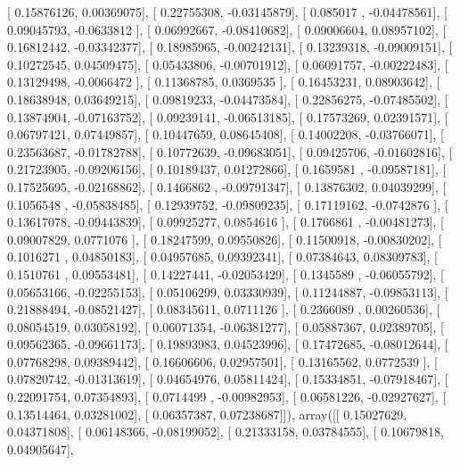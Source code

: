 \documentclass{article}
\begin{document}
       [ 0.15876126,  0.00369075],
       [ 0.22755308, -0.03145879],
       [ 0.085017  , -0.04478561],
       [ 0.09045793, -0.0633812 ],
       [ 0.06992667, -0.08410682],
       [ 0.09006604,  0.08957102],
       [ 0.16812442, -0.03342377],
       [ 0.18985965, -0.00242131],
       [ 0.13239318, -0.09009151],
       [ 0.10272545,  0.04509475],
       [ 0.05433806, -0.00701912],
       [ 0.06091757, -0.00222483],
       [ 0.13129498, -0.0066472 ],
       [ 0.11368785,  0.0369535 ],
       [ 0.16453231,  0.08903642],
       [ 0.18638948,  0.03649215],
       [ 0.09819233, -0.04473584],
       [ 0.22856275, -0.07485502],
       [ 0.13874904, -0.07163752],
       [ 0.09239141, -0.06513185],
       [ 0.17573269,  0.02391571],
       [ 0.06797421,  0.07449857],
       [ 0.10447659,  0.08645408],
       [ 0.14002208, -0.03766071],
       [ 0.23563687, -0.01782788],
       [ 0.10772639, -0.09683051],
       [ 0.09425706, -0.01602816],
       [ 0.21723905, -0.09206156],
       [ 0.10189437,  0.01272866],
       [ 0.1659581 , -0.09587181],
       [ 0.17525695, -0.02168862],
       [ 0.1466862 , -0.09791347],
       [ 0.13876302,  0.04039299],
       [ 0.1056548 , -0.05838485],
       [ 0.12939752, -0.09809235],
       [ 0.17119162, -0.0742876 ],
       [ 0.13617078, -0.09443839],
       [ 0.09925277,  0.0854616 ],
       [ 0.1766861 , -0.00481273],
       [ 0.09007829,  0.0771076 ],
       [ 0.18247599,  0.09550826],
       [ 0.11500918, -0.00830202],
       [ 0.1016271 ,  0.04850183],
       [ 0.04957685,  0.09392341],
       [ 0.07384643,  0.08309783],
       [ 0.1510761 ,  0.09553481],
       [ 0.14227441, -0.02053429],
       [ 0.1345589 , -0.06055792],
       [ 0.05653166, -0.02255153],
       [ 0.05106299,  0.03330939],
       [ 0.11244887, -0.09853113],
       [ 0.21888494, -0.08521427],
       [ 0.08345611,  0.0711126 ],
       [ 0.2366089 ,  0.00260536],
       [ 0.08054519,  0.03058192],
       [ 0.06071354, -0.06381277],
       [ 0.05887367,  0.02389705],
       [ 0.09562365, -0.09661173],
       [ 0.19893983,  0.04523996],
       [ 0.17472685, -0.08012644],
       [ 0.07768298,  0.09389442],
       [ 0.16606606,  0.02957501],
       [ 0.13165562,  0.0772539 ],
       [ 0.07820742, -0.01313619],
       [ 0.04654976,  0.05811424],
       [ 0.15334851, -0.07918467],
       [ 0.22091754,  0.07354893],
       [ 0.0714499 , -0.00982953],
       [ 0.06581226, -0.02927627],
       [ 0.13514464,  0.03281002],
       [ 0.06357387,  0.07238687]]), array([[ 0.15027629,  0.04371808],
       [ 0.06148366, -0.08199052],
       [ 0.21333158,  0.03784555],
       [ 0.10679818,  0.04905647],
\end{document}
